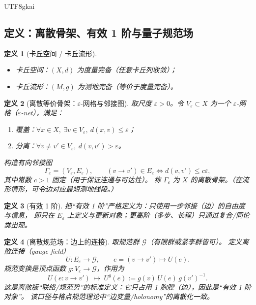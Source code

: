 \documentclass[12pt]{article}
\newtheorem{definition}{定义}[section]
\begin{document}
\begin{CJK*}{UTF8}{gkai}
\subsection{定义：离散骨架、有效 1 阶与量子规范场}
\label{subsec:tex27-ch4-defs}

\begin{definition}[卡丘空间 / 卡丘流形]
\label{def:tex27-ch4-d1}
\begin{itemize}
  \item 卡丘空间：$(X,d)$ 为度量完备（任意卡丘列收敛）；
  \item 卡丘流形：$(M,g)$ 为测地完备（等价于度量完备）。
\end{itemize}
\end{definition}

\begin{definition}[离散等价骨架：$\varepsilon$-网格与邻接图]
\label{def:tex27-ch4-d2}
取尺度 $\varepsilon>0$。令 $V_\varepsilon\subset X$ 为一个 $\varepsilon$-网格（$\varepsilon$-net），满足：
\begin{enumerate}
  \item 覆盖：$\forall x\in X,\ \exists v\in V_\varepsilon,\ d(x,v)\le \varepsilon$；
  \item 分离：$\forall v\neq v'\in V_\varepsilon,\ d(v,v')>\varepsilon$。
\end{enumerate}
构造有向邻接图
\[
  \Gamma_\varepsilon=(V_\varepsilon,E_\varepsilon),\qquad
  (v\to v')\in E_\varepsilon \iff d(v,v')\le c\varepsilon,
\]
其中常数 $c>1$ 固定（用于保证连通与可达性）。
称 $\Gamma_\varepsilon$ 为 $X$ 的离散骨架。（在流形情形，可令边对应最短测地线段。）
\end{definition}

\begin{definition}[有效 1 阶]
\label{def:tex27-ch4-d3}
把“有效 1 阶”严格定义为：只使用一步邻接（边）的自由度与信息，
即只在 $E_\varepsilon$ 上定义与更新对象；更高阶（多步、长程）只通过复合/同伦类出现。
\end{definition}

\begin{definition}[离散规范场：边上的连接]
\label{def:tex27-ch4-d4}
取规范群 $\mathcal{G}$（有限群或紧李群皆可）。
定义离散连接（gauge field）
\[
  U:E_\varepsilon\to \mathcal{G},\qquad e=(v\to v')\mapsto U(e).
\]
规范变换是顶点函数 $g:V_\varepsilon\to \mathcal{G}$，作用为
\[
  U(e:v\to v')\ \mapsto\ U^g(e):=g(v)\,U(e)\,g(v')^{-1}.
\]
这是离散版“联络/规范势”的标准定义：它只占用 1-胞腔（边），因此是“有效 1 阶对象”。
该口径与格点规范理论中“边变量/holonomy”的离散化一致\cite{Wilson1974}。
\end{definition}


\end{CJK*}
\end{document}
